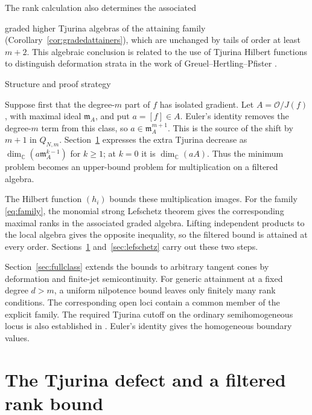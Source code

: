 \documentclass[12pt,reqno]{amsart}
\makeatletter
\renewcommand\subsection{\@startsection{subsection}{2}%
  \z@{.8\linespacing\@plus.3\linespacing}{.35\linespacing}%
  {\normalfont\bfseries}}
\newcommand{\C}{\mathbb C}
\newcommand{\mm}{\mathfrak m}
\newcommand{\OO}{\mathcal O}
\theoremstyle{definition}
\makeatother
\begin{document}
The rank calculation also determines the associated

graded higher Tjurina algebras of the attaining family
(Corollary~\ref{cor:gradedattainers}), which are unchanged by tails
of order at least $m+2$. This algebraic conclusion is related to the
use of Tjurina Hilbert functions to distinguish deformation strata
in the work of Greuel--Hertling--Pfister \cite{GreuelHertlingPfister}.


\subsection{Structure and proof strategy}

Suppose first that the degree-$m$ part of $f$ has isolated gradient.
Let $A=\OO/J(f)$, with maximal ideal
$\mm_A$, and put $a=[f]\in A$.
Euler's identity removes the degree-$m$ term from this class, so
$a\in\mm_A^{m+1}$. This is the source of the shift by $m+1$ in
$Q_{N,m}$.
Section~\ref{sec:filtrations} expresses the extra Tjurina decrease
as $\dim_\C(a\mm_A^{k-1})$ for $k\geq1$; at $k=0$ it is
$\dim_\C(aA)$. Thus the minimum problem becomes an upper-bound
problem for multiplication on a filtered algebra.

 
The Hilbert function $(h_i)$ bounds these multiplication images.
For the family \eqref{eq:family}, the monomial strong Lefschetz theorem
\cite{Stanley,PhuongTran} gives the corresponding maximal ranks in
the associated graded algebra. Lifting independent products to the
local algebra gives the opposite inequality, so the filtered bound
is attained at every order. Sections~\ref{sec:filtrations}
and~\ref{sec:lefschetz} carry out these two steps.


Section~\ref{sec:fullclass} extends the bounds to arbitrary tangent cones
by deformation and finite-jet semicontinuity. For generic attainment
at a fixed degree $d>m$, a uniform nilpotence bound leaves only finitely
many rank conditions. The corresponding open loci contain a common
member of the explicit family. The required Tjurina cutoff on the ordinary semihomogeneous
locus is also established in
\cite[Proposition~4.3]{LiuYauZhang2026}.
Euler's identity gives the homogeneous boundary values.


\section{The Tjurina defect and a filtered rank bound}
\label{sec:filtrations}
\end{document}
